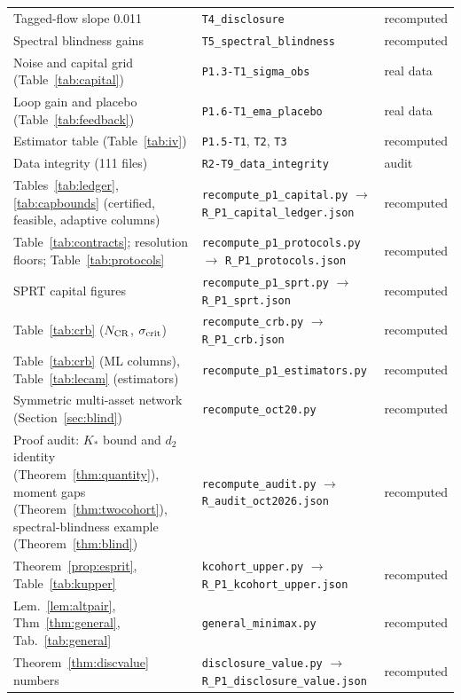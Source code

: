 \begin{longtable}{p{}p{}p{}}
Tagged-flow slope 0.011 & \nolinkurl{T4_disclosure} & recomputed\\
Spectral blindness gains & \nolinkurl{T5_spectral_blindness} & recomputed\\
Noise and capital grid (Table~\ref{tab:capital}) & \nolinkurl{P1.3-T1_sigma_obs} & real data\\
Loop gain and placebo (Table~\ref{tab:feedback}) & \nolinkurl{P1.6-T1_ema_placebo} & real data\\
Estimator table (Table~\ref{tab:iv}) & \nolinkurl{P1.5-T1}, \nolinkurl{T2}, \nolinkurl{T3} & recomputed\\
Data integrity (111 files) & \nolinkurl{R2-T9_data_integrity} & audit\\
Tables~\ref{tab:ledger}, \ref{tab:capbounds} (certified, feasible, adaptive columns) & \nolinkurl{recompute_p1_capital.py} $\to$ \nolinkurl{R_P1_capital_ledger.json} & recomputed\\
Table~\ref{tab:contracts}; resolution floors; Table~\ref{tab:protocols} & \nolinkurl{recompute_p1_protocols.py} $\to$ \nolinkurl{R_P1_protocols.json} & recomputed\\
SPRT capital figures & \nolinkurl{recompute_p1_sprt.py} $\to$ \nolinkurl{R_P1_sprt.json} & recomputed\\
Table~\ref{tab:crb} ($N_{\rm CR}$, $\sigma_{\rm crit}$) & \nolinkurl{recompute_crb.py} $\to$ \nolinkurl{R_P1_crb.json} & recomputed\\
Table~\ref{tab:crb} (ML columns), Table~\ref{tab:lecam} (estimators) & \nolinkurl{recompute_p1_estimators.py} & recomputed\\
Symmetric multi-asset network (Section~\ref{sec:blind}) & \nolinkurl{recompute_oct20.py} & recomputed\\
Proof audit: $K_*$ bound and $d_2$ identity (Theorem~\ref{thm:quantity}), moment gaps (Theorem~\ref{thm:twocohort}), spectral-blindness example (Theorem~\ref{thm:blind}) & \nolinkurl{recompute_audit.py} $\to$ \nolinkurl{R_audit_oct2026.json} & recomputed\\
Theorem~\ref{prop:esprit}, Table~\ref{tab:kupper} & \nolinkurl{kcohort_upper.py} $\to$ \nolinkurl{R_P1_kcohort_upper.json} & recomputed\\
Lem.~\ref{lem:altpair}, Thm~\ref{thm:general}, Tab.~\ref{tab:general} & \nolinkurl{general_minimax.py} & recomputed\\
Theorem~\ref{thm:discvalue} numbers & \nolinkurl{disclosure_value.py} $\to$ \nolinkurl{R_P1_disclosure_value.json} & recomputed\\

\end{longtable}
